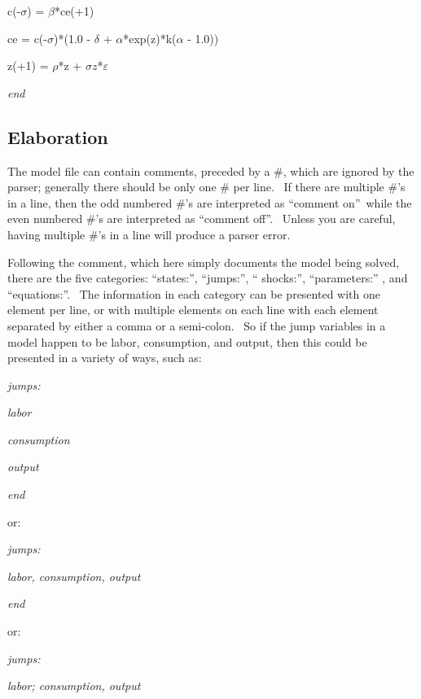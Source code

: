 \documentclass[notitlepage,11pt]{article}
\begin{document}
c(-$\sigma $) = $\beta $*ce(+1)

ce = c(-$\sigma $)*(1.0 - $\delta $ + $\alpha $*exp(z)*k($\alpha $ - 1.0))

z(+1) = $\rho $*z + $\sigma z$*$\varepsilon $

\textit{end}

\subsection{Elaboration}

The model file can contain comments, preceded by a \#, which are ignored by
the parser; generally there should be only one \# per line. \ If there are
multiple \#'s in a line, then the odd numbered \#'s are interpreted as
\textquotedblleft comment on\textquotedblright\ while the even numbered \#'s
are interpreted as \textquotedblleft comment off\textquotedblright . \
Unless you are careful, having multiple \#'s in a line will produce a parser
error.

Following the comment, which here simply documents the model being solved,
there are the five categories: \textquotedblleft states:\textquotedblright ,
\textquotedblleft jumps:\textquotedblright , \textquotedblleft
shocks:\textquotedblright , \textquotedblleft parameters:\textquotedblright
, and \textquotedblleft equations:\textquotedblright . \ The information in
each category can be presented with one element per line, or with multiple
elements on each line with each element separated by either a comma or a
semi-colon. \ So if the jump variables in a model happen to be labor,
consumption, and output, then this could be presented in a variety of ways,
such as:

\bigskip

\textit{jumps:}

\textit{labor}

\textit{consumption}

\textit{output}

\textit{end}

\bigskip

or:

\textit{jumps:}

\textit{labor, consumption, output}

\textit{end}

\bigskip

or:

\textit{jumps:}

\textit{labor; consumption, output}
\end{document}
